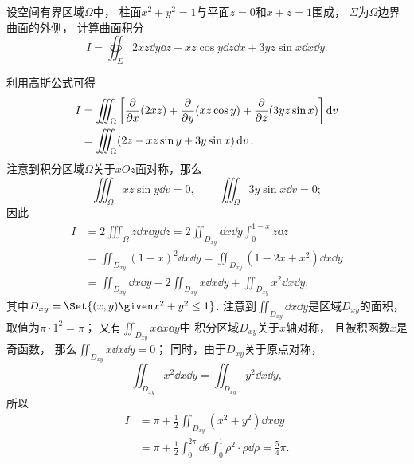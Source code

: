 \begin{example}
设空间有界区域\(\Omega\)中，
柱面\(x^2+y^2=1\)与平面\(z=0\)和\(x+z=1\)围成，
\(\Sigma\)为\(\Omega\)边界曲面的外侧，
计算曲面积分\[
	I = \oiint_\Sigma 2xz \dd{y}\dd{z} + xz \cos y \dd{z}\dd{x} + 3yz \sin x \dd{x}\dd{y}.
\]
\begin{solution}
利用高斯公式可得
\begin{align*}
	I &= \iiint_\Omega \left[
			\pdv{x}(2xz)
			+ \pdv{y}(xz \cos y)
			+ \pdv{z}(3yz \sin x)
		\right] \dd{v} \\
	&= \iiint_\Omega (2z - xz \sin y + 3y \sin x) \dd{v}.
\end{align*}
注意到积分区域\(\Omega\)关于\(xOz\)面对称，那么\[
	\iiint_\Omega xz \sin y \dd{v} = 0,
	\qquad
	\iiint_\Omega 3y \sin x \dd{v} = 0;
\]
因此\begin{align*}
	I &= 2 \iiint_\Omega z \dd{x}\dd{y}\dd{z}
	= 2 \iint_{D_{xy}} \dd{x}\dd{y} \int_0^{1-x} z \dd{z} \\
	&= \iint_{D_{xy}} (1-x)^2 \dd{x}\dd{y}
	= \iint_{D_{xy}} (1-2x+x^2) \dd{x}\dd{y} \\
	&= \iint_{D_{xy}} \dd{x}\dd{y}
	- 2 \iint_{D_{xy}} x \dd{x}\dd{y}
	+ \iint_{D_{xy}} x^2 \dd{x}\dd{y},
\end{align*}
其中\(D_{xy} = \Set{(x,y) \given x^2+y^2\leq1}\).
注意到\(\iint_{D_{xy}} \dd{x}\dd{y}\)是区域\(D_{xy}\)的面积，
取值为\(\pi\cdot1^2=\pi\)；
又有\(\iint_{D_{xy}} x \dd{x}\dd{y}\)中
积分区域\(D_{xy}\)关于\(x\)轴对称，
且被积函数\(x\)是奇函数，
那么\(\iint_{D_{xy}} x \dd{x}\dd{y} = 0\)；
同时，由于\(D_{xy}\)关于原点对称，\[
	\iint_{D_{xy}} x^2 \dd{x}\dd{y} = \iint_{D_{xy}} y^2 \dd{x}\dd{y},
\]
所以\begin{align*}
	I &= \pi + \frac{1}{2} \iint_{D_{xy}} (x^2+y^2) \dd{x}\dd{y} \\
	&= \pi + \frac{1}{2}
		\int_0^{2\pi} \dd{\theta} \int_0^1 \rho^2 \cdot \rho\dd{\rho}
	= \frac{5}{4} \pi.
\end{align*}
\end{solution}
\end{example}

